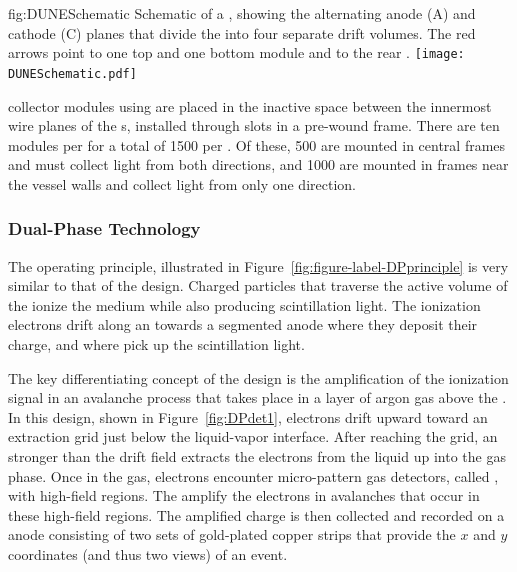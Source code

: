 \begin{dunefigure}{fig:DUNESchematic}
{Schematic of a \nominalmodsize {}  , showing the alternating anode (A) and cathode (C) planes that divide the  into four separate drift volumes. The red arrows point to one top and one bottom  module and to the rear .}
\texttt{[image: DUNESchematic.pdf]}
\end{dunefigure}

 collector modules using  are placed in the inactive space between the innermost wire planes of the s, installed through slots in a pre-wound  frame.  %
There are ten  modules per  for a total of \num{1500} per .  Of these, \num{500} are mounted in central  frames and must collect light from both directions, %
and \num{1000} are mounted in frames  near the vessel walls and collect light from only one direction. %

\FloatBarrier
\subsubsection{Dual-Phase Technology}
\label{sec:fddp-exec-splar}

The  operating principle, illustrated in Figure~\ref{fig:figure-label-DPprinciple} is very similar to that of the  design.  Charged particles that traverse the active volume of the  ionize the medium while also producing scintillation light.  The ionization electrons drift along an \efield towards a segmented anode where they deposit their charge, and where   pick up the scintillation light. 

The key differentiating concept of the  design is the amplification of the ionization signal in an avalanche process that takes place in a layer of argon gas above the .  
In this design, shown in Figure~\ref{fig:DPdet1}, electrons drift upward toward an extraction grid just below the liquid-vapor interface. 
After reaching the grid, an \efield stronger than the \dpnominaldriftfield{} drift field extracts the electrons from the liquid up into the gas phase. Once in the gas, electrons encounter micro-pattern gas detectors, called , with high-field regions. The  amplify the electrons in avalanches that occur in these high-field regions. The amplified charge is then collected and recorded on a \twod anode
consisting of two sets of %
gold-plated copper strips that provide the $x$ and $y$ coordinates (and thus two views) of an event. 

